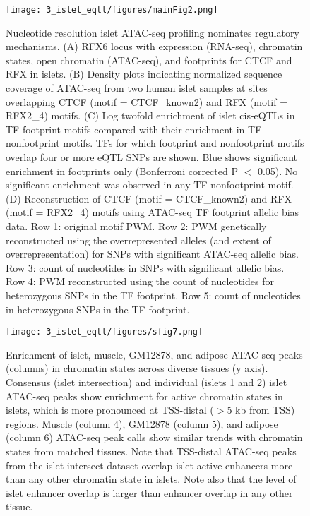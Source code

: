 \begin{figure}
    \centering
    \texttt{[image: 3\_islet\_eqtl/figures/mainFig2.png]}
    \caption[Nucleotide resolution islet ATAC-seq profiling nominates regulatory mechanisms]{Nucleotide resolution islet ATAC-seq profiling nominates regulatory mechanisms. (A) RFX6 locus with expression (RNA-seq), chromatin states, open chromatin (ATAC-seq), and footprints for CTCF and RFX in islets. (B) Density plots indicating normalized sequence coverage of ATAC-seq from two human islet samples at sites overlapping CTCF (motif = CTCF\_known2) and RFX (motif = RFX2\_4) motifs. (C) Log twofold enrichment of islet cis-eQTLs in TF footprint motifs compared with their enrichment in TF nonfootprint motifs. TFs for which footprint and nonfootprint motifs overlap four or more eQTL SNPs are shown. Blue shows significant enrichment in footprints only (Bonferroni corrected P $<$ 0.05). No significant enrichment was observed in any TF nonfootprint motif. (D) Reconstruction of CTCF (motif = CTCF\_known2) and RFX (motif = RFX2\_4) motifs using ATAC-seq TF footprint allelic bias data. Row 1: original motif PWM. Row 2: PWM genetically reconstructed using the overrepresented alleles (and extent of overrepresentation) for SNPs with significant ATAC-seq allelic bias. Row 3: count of nucleotides in SNPs with significant allelic bias. Row 4: PWM reconstructed using the count of nucleotides for heterozygous SNPs in the TF footprint. Row 5: count of nucleotides in heterozygous SNPs in the TF footprint.}
    \label{fig:c2_f2}
\end{figure}

\begin{figure}
    \centering
    \texttt{[image: 3\_islet\_eqtl/figures/sfig7.png]}
    \caption[Enrichment of islet, muscle, GM12878, and adipose ATAC-seq peaks in chromatin states across diverse tissues]{Enrichment of islet, muscle, GM12878, and adipose ATAC-seq peaks (columns) in chromatin states across diverse tissues (y axis). Consensus (islet intersection) and individual (islets 1 and 2) islet ATAC-seq peaks show enrichment for active chromatin states in islets, which is more pronounced at TSS-distal ($>$5 kb from TSS) regions. Muscle (column 4), GM12878 (column 5), and adipose (column 6) ATAC-seq peak calls show similar trends with chromatin states from matched tissues. Note that TSS-distal ATAC-seq peaks from the islet intersect dataset overlap islet active enhancers more than any other chromatin state in islets. Note also that the level of islet enhancer overlap is larger than enhancer overlap in any other tissue.}
    \label{fig:c2_sf7}
\end{figure}

